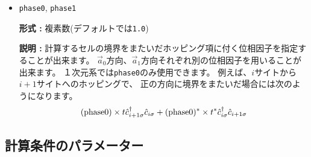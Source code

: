 \begin{itemize}
\item \verb|phase0|, \verb|phase1|

  {\bf 形式 :} 複素数(デフォルトでは\verb|1.0|)
  
  {\bf 説明 :} 計算するセルの境界をまたいだホッピング項に付く位相因子を指定することが出来ます。
  $\vec{a}_0$方向、$\vec{a}_1$方向それぞれ別の位相因子を用いることが出来ます。
  １次元系では\verb|phase0|のみ使用できます。
  例えば、$i$サイトから$i+1$サイトへのホッピングで、
  正の方向に境界をまたいだ場合には次のようになります。
  \begin{align}
    ({\rm phase0}) \times t {\hat c}_{i+1 \sigma}^\dagger {\hat c}_{i \sigma}
    + ({\rm phase0})^* \times t^* {\hat c}_{i \sigma}^\dagger {\hat c}_{i+1 \sigma}
  \end{align}

\end{itemize}

\subsection{計算条件のパラメーター}


